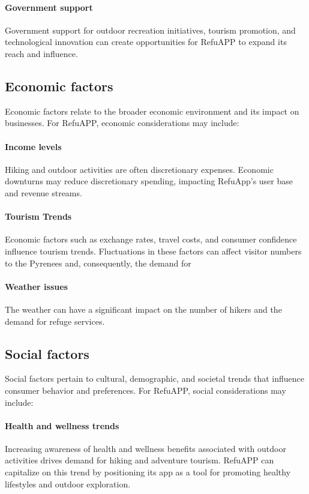 \paragraph{Government support}
Government support for outdoor recreation initiatives, tourism promotion, and technological innovation can create opportunities for RefuAPP to expand its reach and influence.

\subsection{Economic factors}\label{subsec:economic-factors}
Economic factors relate to the broader economic environment and its impact on businesses.
For RefuAPP, economic considerations may include:

\paragraph{Income levels}
Hiking and outdoor activities are often discretionary expenses.
Economic downturns may reduce discretionary spending, impacting RefuApp's user base and revenue streams.

\paragraph{Tourism Trends}
Economic factors such as exchange rates, travel costs, and consumer confidence influence tourism trends.
Fluctuations in these factors can affect visitor numbers to the Pyrenees and, consequently, the demand for

\paragraph{Weather issues}
The weather can have a significant impact on the number of hikers and the demand for refuge services.

\subsection{Social factors}\label{subsec:social-factors}
Social factors pertain to cultural, demographic, and societal trends that influence consumer behavior and preferences.
For RefuAPP, social considerations may include:

\paragraph{Health and wellness trends}
Increasing awareness of health and wellness benefits associated with outdoor activities drives demand for hiking and adventure tourism.
RefuAPP can capitalize on this trend by positioning its app as a tool for promoting healthy lifestyles and outdoor exploration.

